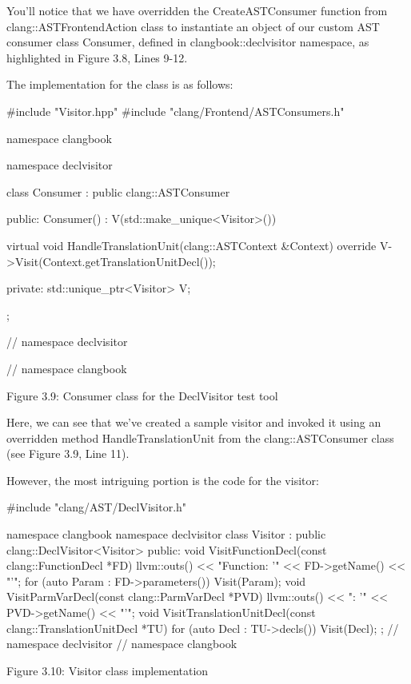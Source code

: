 You’ll notice that we have overridden the CreateASTConsumer function from clang::ASTFrontendAction class to instantiate an object of our custom AST consumer class Consumer, defined in clangbook::declvisitor namespace, as highlighted in Figure 3.8, Lines 9-12.

The implementation for the class is as follows:

\begin{cpp}
#include "Visitor.hpp"
#include "clang/Frontend/ASTConsumers.h"

namespace clangbook {
namespace declvisitor {
class Consumer : public clang::ASTConsumer {
public:
  Consumer() : V(std::make_unique<Visitor>()) {}

  virtual void HandleTranslationUnit(clang::ASTContext &Context) override {
    V->Visit(Context.getTranslationUnitDecl());
  }

private:
  std::unique_ptr<Visitor> V;
};
} // namespace declvisitor
} // namespace clangbook
\end{cpp}

\begin{center}
Figure 3.9: Consumer class for the DeclVisitor test tool
\end{center}

Here, we can see that we’ve created a sample visitor and invoked it using an overridden method HandleTranslationUnit from the clang::ASTConsumer class (see Figure 3.9, Line 11).

However, the most intriguing portion is the code for the visitor:

\begin{cpp}
#include "clang/AST/DeclVisitor.h"

namespace clangbook {
namespace declvisitor {
class Visitor : public clang::DeclVisitor<Visitor> {
public:
  void VisitFunctionDecl(const clang::FunctionDecl *FD) {
    llvm::outs() << "Function: ’" << FD->getName() << "’\n";
    for (auto Param : FD->parameters()) {
      Visit(Param);
    }
  }
  void VisitParmVarDecl(const clang::ParmVarDecl *PVD) {
    llvm::outs() << "\tParameter: ’" << PVD->getName() << "’\n";
  }
  void VisitTranslationUnitDecl(const clang::TranslationUnitDecl *TU) {
    for (auto Decl : TU->decls()) {
      Visit(Decl);
    }
  }
};
} // namespace declvisitor
} // namespace clangbook
\end{cpp}

\begin{center}
Figure 3.10: Visitor class implementation
\end{center}


